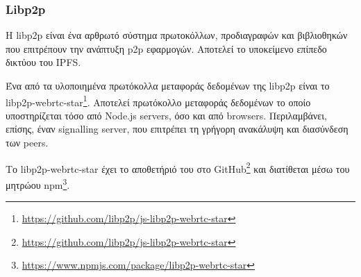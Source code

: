 \subsubsection{Libp2p} \label{subsection:4-2-4-3-libp2p}


Η libp2p είναι ένα αρθρωτό σύστημα πρωτοκόλλων, προδιαγραφών και βιβλιοθηκών που επιτρέπουν την ανάπτυξη p2p εφαρμογών. Αποτελεί το υποκείμενο επίπεδο δικτύου του IPFS.\cite{2.7-ipfs-docs}

Ένα από τα υλοποιημένα πρωτόκολλα μεταφοράς δεδομένων της libp2p είναι το libp2p-webrtc-star\footnote{\url{https://github.com/libp2p/js-libp2p-webrtc-star}}. Αποτελεί πρωτόκολλο μεταφοράς δεδομένων το οποίο υποστηρίζεται τόσο από Node.js servers, όσο και από browsers. Περιλαμβάνει, επίσης, έναν signalling server, που επιτρέπει τη γρήγορη ανακάλυψη και διασύνδεση των peers.

Το libp2p-webrtc-star έχει το αποθετήριό του στο GitHub\footnote{\url{https://github.com/libp2p/js-libp2p-webrtc-star}} και διατίθεται μέσω του μητρώου npm\footnote{\url{https://www.npmjs.com/package/libp2p-webrtc-star}}.
